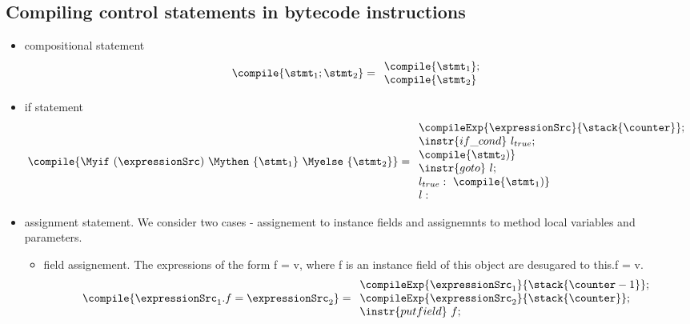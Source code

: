 \subsection{Compiling control statements in bytecode instructions}

\begin{itemize}
  \item compositional statement
      $$\compile{\stmt_1; \stmt_2} =  
      \begin{array}{l}
            \compile{\stmt_1};\\
	    \compile{\stmt_2}
       \end{array}$$
    
  \item   if statement
    $$\compile{ \Myif \ (\expressionSrc) \ \Mythen \ \{ \stmt_1 \} \  \Myelse \ \{ \stmt_2 \}   } = 
        \begin{array}{l}
	    \compileExp{\expressionSrc}{\stack{\counter}}; \\
            \instr{if\_cond} \ l_{true} ;\\
            \compile{\stmt_2)}\\
             \instr{goto} \ l; \\
            l_{true}: \ \compile{\stmt_1)} \\ 
            l:
	\end{array}
    $$

\item assignment statement. We consider two cases - assignement to instance fields and assignemnts to method local variables and parameters. 

\begin{itemize}
    \item field assignement. The expressions of the form \textrm{ f = v}, where \textrm{f} is an instance field of \textrm{this} object
are desugared to \textrm{this.f = v}.
        $$\compile{\expressionSrc_1.f= \expressionSrc_2} =
             \begin{array}{l}
                        \compileExp{\expressionSrc_1}{\stack{\counter -1}};\\
			\compileExp{\expressionSrc_2}{\stack{\counter}};\\
			\instr{putfield} \ f;
             \end{array}
 $$ 

 

\end{itemize}
\end{itemize}
